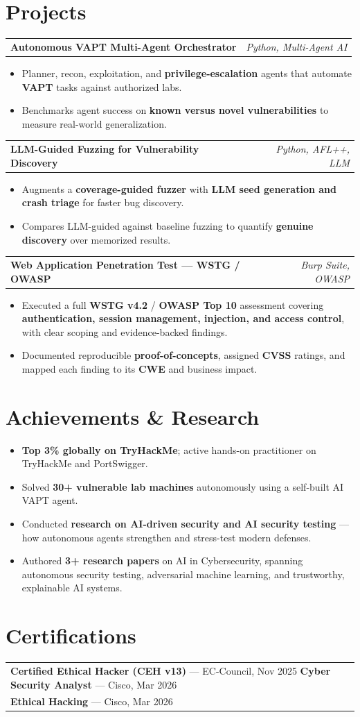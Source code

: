 \documentclass[a4paper,10pt]{article}
\makeatletter
\newcommand{\project}[4]{%
  \begin{tabularx}{\textwidth}{@{}X@{\hspace{8pt}}r@{}}
    \textbf{#1} & \textit{\color{black!70}#2}\\
  \end{tabularx}
  \begin{itemize}
    \item #3
    \item #4
  \end{itemize}\vspace{2pt}%
}
\makeatother
\begin{document}
\section{Projects}
\project{Autonomous VAPT Multi-Agent Orchestrator}{Python, Multi-Agent AI}
{Planner, recon, exploitation, and \textbf{privilege-escalation} agents that automate \textbf{VAPT} tasks against authorized labs.}
{Benchmarks agent success on \textbf{known versus novel vulnerabilities} to measure real-world generalization.}
\project{LLM-Guided Fuzzing for Vulnerability Discovery}{Python, AFL++, LLM}
{Augments a \textbf{coverage-guided fuzzer} with \textbf{LLM seed generation and crash triage} for faster bug discovery.}
{Compares LLM-guided against baseline fuzzing to quantify \textbf{genuine discovery} over memorized results.}
\project{Web Application Penetration Test — WSTG / OWASP}{Burp Suite, OWASP}
{Executed a full \textbf{WSTG v4.2} / \textbf{OWASP Top 10} assessment covering \textbf{authentication, session management, injection, and access control}, with clear scoping and evidence-backed findings.}
{Documented reproducible \textbf{proof-of-concepts}, assigned \textbf{CVSS} ratings, and mapped each finding to its \textbf{CWE} and business impact.}

\section{Achievements \& Research}
\begin{itemize}
  \item \textbf{Top 3\% globally on TryHackMe}; active hands-on practitioner on TryHackMe and PortSwigger.
  \item Solved \textbf{30+ vulnerable lab machines} autonomously using a self-built AI VAPT agent.
  \item Conducted \textbf{research on AI-driven security and AI security testing} — how autonomous agents strengthen and stress-test modern defenses.
  \item Authored \textbf{3+ research papers} on AI in Cybersecurity, spanning autonomous security testing, adversarial machine learning, and trustworthy, explainable AI systems.
\end{itemize}

\section{Certifications}
\begin{tabularx}{\textwidth}{@{}X@{}}
\textbf{Certified Ethical Hacker (CEH v13)} — EC-Council, Nov 2025 \hfill \textbf{Cyber Security Analyst} — Cisco, Mar 2026\\[2pt]
\textbf{Ethical Hacking} — Cisco, Mar 2026\\
\end{tabularx}
\end{document}
